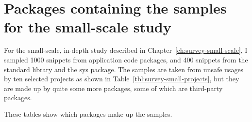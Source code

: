
\chapter{Packages containing the samples for the small-scale study}\label{ch:survey-small-appendix-packages}

For the small-scale, in-depth study described in Chapter~\ref{ch:survey-small-scale}, I sampled 1000 snippets from
application code packages, and 400 snippets from the standard library and the sys package.
The samples are taken from unsafe usages by ten selected projects as shown in Table~\ref{tbl:survey-small-projects},
but they are made up by quite some more packages, some of which are third-party packages.

These tables show which packages make up the samples.


